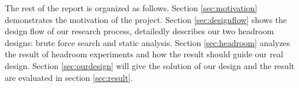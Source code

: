  The rest of the report is organized as follows. Section \ref{sec:motivation} demonstrates the motivation of the project. Section \ref{sec:designflow} shows the design flow of our research process, detailedly describes our two headroom designs: brute force search and static analysis. Section \ref{sec:headroom} analyzes the result of headroom experiments and how the result should guide our real design. Section \ref{sec:ourdesign} will give the solution of our design and the result are evaluated in section \ref{sec:result}.
